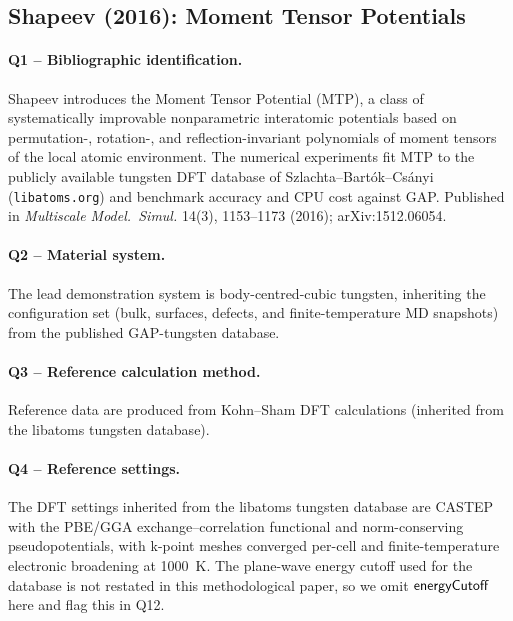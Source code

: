 \subsection{Shapeev (2016): Moment Tensor Potentials}
\label{sec:appendix-example-shapeev2016}

\paragraph{Q1 -- Bibliographic identification.}
Shapeev introduces the Moment Tensor Potential (MTP), a class
of systematically improvable nonparametric interatomic
potentials based on permutation-, rotation-, and
reflection-invariant polynomials of moment tensors of the local
atomic environment. The numerical experiments fit MTP to the
publicly available tungsten DFT database of
Szlachta--Bart\'ok--Cs\'anyi (\texttt{libatoms.org}) and
benchmark accuracy and CPU cost against GAP. Published in
\emph{Multiscale Model.\ Simul.} 14(3), 1153--1173 (2016);
arXiv:1512.06054.


\paragraph{Q2 -- Material system.}
The lead demonstration system is body-centred-cubic tungsten,
inheriting the configuration set (bulk, surfaces, defects, and
finite-temperature MD snapshots) from the published GAP-tungsten
database.


\paragraph{Q3 -- Reference calculation method.}
Reference data are produced from Kohn--Sham DFT calculations
(inherited from the libatoms tungsten database).


\paragraph{Q4 -- Reference settings.}
The DFT settings inherited from the libatoms tungsten database
are CASTEP with the PBE/GGA exchange--correlation functional and
norm-conserving pseudopotentials, with k-point meshes converged
per-cell and finite-temperature electronic broadening at 1000~K.
The plane-wave energy cutoff used for the database is not
restated in this methodological paper, so we omit
$\mathsf{energyCutoff}$ here and flag this in Q12.


